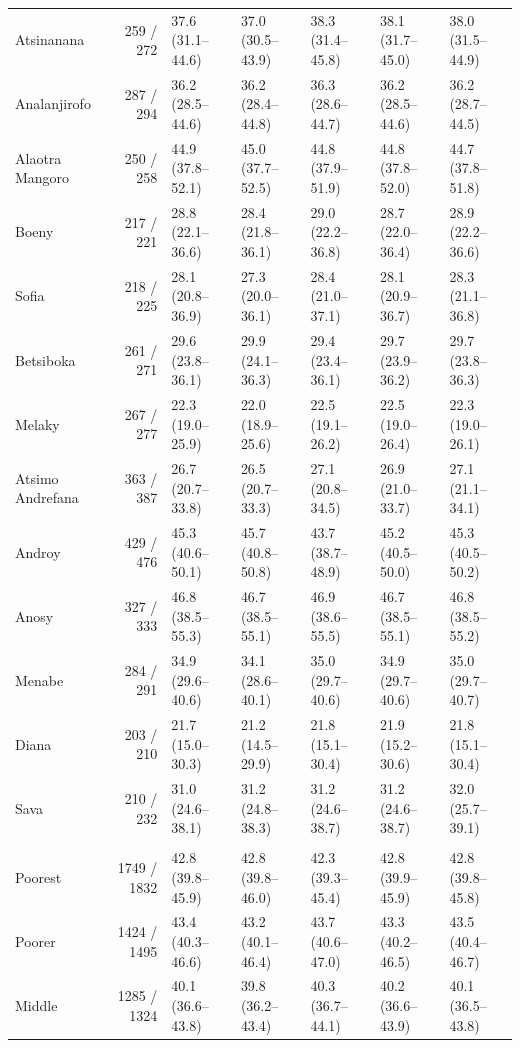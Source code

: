 \begin{longtable}{l|rlllll}
Atsinanana & 259 / 272 & 37.6 (31.1–44.6) & 37.0 (30.5–43.9) & 38.3 (31.4–45.8) & 38.1 (31.7–45.0) & 38.0 (31.5–44.9) \\ 
Analanjirofo & 287 / 294 & 36.2 (28.5–44.6) & 36.2 (28.4–44.8) & 36.3 (28.6–44.7) & 36.2 (28.5–44.6) & 36.2 (28.7–44.5) \\ 
Alaotra Mangoro & 250 / 258 & 44.9 (37.8–52.1) & 45.0 (37.7–52.5) & 44.8 (37.9–51.9) & 44.8 (37.8–52.0) & 44.7 (37.8–51.8) \\ 
Boeny & 217 / 221 & 28.8 (22.1–36.6) & 28.4 (21.8–36.1) & 29.0 (22.2–36.8) & 28.7 (22.0–36.4) & 28.9 (22.2–36.6) \\ 
Sofia & 218 / 225 & 28.1 (20.8–36.9) & 27.3 (20.0–36.1) & 28.4 (21.0–37.1) & 28.1 (20.9–36.7) & 28.3 (21.1–36.8) \\ 
Betsiboka & 261 / 271 & 29.6 (23.8–36.1) & 29.9 (24.1–36.3) & 29.4 (23.4–36.1) & 29.7 (23.9–36.2) & 29.7 (23.8–36.3) \\ 
Melaky & 267 / 277 & 22.3 (19.0–25.9) & 22.0 (18.9–25.6) & 22.5 (19.1–26.2) & 22.5 (19.0–26.4) & 22.3 (19.0–26.1) \\ 
Atsimo Andrefana & 363 / 387 & 26.7 (20.7–33.8) & 26.5 (20.7–33.3) & 27.1 (20.8–34.5) & 26.9 (21.0–33.7) & 27.1 (21.1–34.1) \\ 
Androy & 429 / 476 & 45.3 (40.6–50.1) & 45.7 (40.8–50.8) & 43.7 (38.7–48.9) & 45.2 (40.5–50.0) & 45.3 (40.5–50.2) \\ 
Anosy & 327 / 333 & 46.8 (38.5–55.3) & 46.7 (38.5–55.1) & 46.9 (38.6–55.5) & 46.7 (38.5–55.1) & 46.8 (38.5–55.2) \\ 
Menabe & 284 / 291 & 34.9 (29.6–40.6) & 34.1 (28.6–40.1) & 35.0 (29.7–40.6) & 34.9 (29.7–40.6) & 35.0 (29.7–40.7) \\ 
Diana & 203 / 210 & 21.7 (15.0–30.3) & 21.2 (14.5–29.9) & 21.8 (15.1–30.4) & 21.9 (15.2–30.6) & 21.8 (15.1–30.4) \\ 
Sava & 210 / 232 & 31.0 (24.6–38.1) & 31.2 (24.8–38.3) & 31.2 (24.6–38.7) & 31.2 (24.6–38.7) & 32.0 (25.7–39.1) \\ 
\midrule\addlinespace[2.5pt]
\multicolumn{7}{l}{Stunting — Wealth quintile} \\[2.5pt] 
\midrule\addlinespace[2.5pt]
Poorest & 1749 / 1832 & 42.8 (39.8–45.9) & 42.8 (39.8–46.0) & 42.3 (39.3–45.4) & 42.8 (39.9–45.9) & 42.8 (39.8–45.8) \\ 
Poorer & 1424 / 1495 & 43.4 (40.3–46.6) & 43.2 (40.1–46.4) & 43.7 (40.6–47.0) & 43.3 (40.2–46.5) & 43.5 (40.4–46.7) \\ 
Middle & 1285 / 1324 & 40.1 (36.6–43.8) & 39.8 (36.2–43.4) & 40.3 (36.7–44.1) & 40.2 (36.6–43.9) & 40.1 (36.5–43.8) \\ 

\end{longtable}
